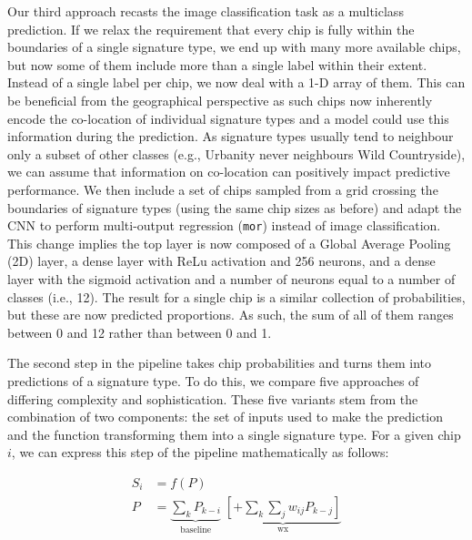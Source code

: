 \documentclass[]{interact}
\theoremstyle{plain}%
\theoremstyle{definition}
\theoremstyle{remark}
\begin{document}
Our third approach recasts the image classification task as a multiclass
prediction. If we relax the requirement that every chip is fully within
the boundaries of a single signature type, we end up with many more available
chips, but now some of them include more than a single label within their
extent. Instead of a single label per chip, we now deal with a 1-D array of them.
This can be beneficial from the geographical perspective as such chips now inherently
encode the co-location of individual signature types and a model could use this information
during the prediction. As signature types usually tend to neighbour only a subset of
other classes (e.g., Urbanity never neighbours Wild Countryside), we can assume that
information on co-location can positively impact predictive performance. We
then include a set of chips sampled from a grid crossing the boundaries of
signature types (using the same chip sizes as before) and adapt the CNN to
perform multi-output regression (\texttt{mor}) instead of image classification. This change
implies the top layer is now composed of a Global Average Pooling (2D) layer, a
dense layer with ReLu
activation and 256 neurons, and a dense layer with the sigmoid activation and a number of
neurons equal to a number of classes (i.e., 12). The result for a single chip is a similar
collection of probabilities, but these are now predicted proportions. As such,
the sum of all of them ranges between 0 and 12 rather than between 0 and 1.

The second step in the pipeline takes chip probabilities and turns them into
predictions of a signature type. To do this, we compare five approaches of
differing complexity and sophistication. These five variants stem from the
combination of two components: the set of inputs used to make the prediction and
the function transforming them into a single signature type. For a given chip
$i$, we can express this step of the pipeline mathematically as follows:

\begin{equation}
\begin{split}
        S_i & = f(P) \\
        P & = \underbrace{
                \sum_{k} P_{k-i}
        }_\text{baseline}\;
        \underbrace{
        \left[+ \sum_{k} \sum_j w_{ij} P_{k-j}\right]
}_\text{wx}
        \label{eq:sp_model}
\end{split}
\end{equation}
\end{document}
